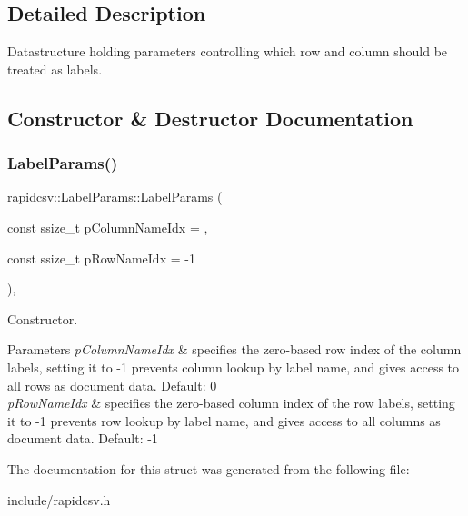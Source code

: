 \subsection{Detailed Description}
Datastructure holding parameters controlling which row and column should be treated as labels. 

\subsection{Constructor \& Destructor Documentation}
\mbox{\label{structrapidcsv_1_1LabelParams_a6064413b9cf2c075178a12c871830c6e}} 
\subsubsection{\texorpdfstring{Label\+Params()}{LabelParams()}}
{\footnotesize\ttfamily rapidcsv\+::\+Label\+Params\+::\+Label\+Params (\begin{DoxyParamCaption}\item[{const ssize\+\_\+t}]{p\+Column\+Name\+Idx = {},  }\item[{const ssize\+\_\+t}]{p\+Row\+Name\+Idx = {\ttfamily -\/1} }\end{DoxyParamCaption})\hspace{0.3cm}{\ttfamily [inline]}, {\ttfamily [explicit]}}



Constructor. 


\begin{DoxyParams}{Parameters}
{\em p\+Column\+Name\+Idx} & specifies the zero-\/based row index of the column labels, setting it to -\/1 prevents column lookup by label name, and gives access to all rows as document data. Default\+: 0 \\
\hline
{\em p\+Row\+Name\+Idx} & specifies the zero-\/based column index of the row labels, setting it to -\/1 prevents row lookup by label name, and gives access to all columns as document data. Default\+: -\/1 \\
\hline
\end{DoxyParams}


The documentation for this struct was generated from the following file\+:\begin{DoxyCompactItemize}
\item 
include/rapidcsv.\+h\end{DoxyCompactItemize}
